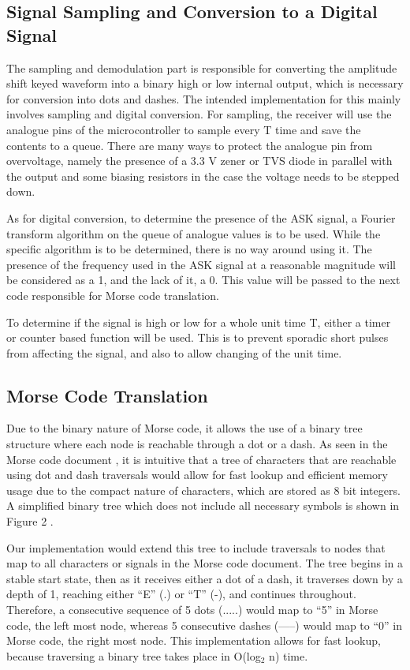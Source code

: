\documentclass{cce2014-design}
\begin{document}
\subsection{Signal Sampling and Conversion to a Digital Signal}
The sampling and demodulation part is responsible for converting the amplitude shift keyed waveform into a binary high or low internal output, which is necessary for conversion into dots and dashes. The intended implementation for this mainly involves sampling and digital conversion. For sampling, the receiver will use the analogue pins of the microcontroller to sample every T time and save the contents to a queue. There are many ways to protect the analogue pin from overvoltage, namely the presence of a 3.3 V zener or TVS diode in parallel with the output and some biasing resistors in the case the voltage needs to be stepped down.

As for digital conversion, to determine the presence of the ASK signal, a Fourier transform algorithm on the queue of analogue values is to be used. While the specific algorithm is to be determined, there is no way around using it. The presence of the frequency used in the ASK signal at a reasonable magnitude will be considered as a 1, and the lack of it, a 0. This value will be passed to the next code responsible for Morse code translation.

To determine if the signal is high or low for a whole unit time T, either a timer or counter based function will be used. This is to prevent sporadic short pulses from affecting the signal, and also to allow changing of the unit time.
\subsection{Morse Code Translation}

Due to the binary nature of Morse code, it allows the use of a binary tree structure where each node is reachable through a dot or a dash. As seen in the Morse code document \cite{itu2009}, it is intuitive that a tree of characters that are reachable using dot and dash traversals would allow for fast lookup and efficient memory usage due to the compact nature of characters, which are stored as 8 bit integers. A simplified binary tree which does not include all necessary symbols is shown in Figure 2 \cite{morsecode-tree}.

Our implementation would extend this tree to include traversals to nodes that map to all characters or signals in the Morse code document. The tree begins in a stable start state, then as it receives either a dot of a dash, it traverses down by a depth of 1, reaching either “E” (.) or “T” (-), and continues throughout. Therefore, a consecutive sequence of 5 dots (.....) would map to “5” in Morse code, the left most node, whereas 5 consecutive dashes (-----) would map to “0” in Morse code, the right most node. This implementation allows for fast lookup, because traversing a binary tree takes place in O(log$_2$ n) time. 
\end{document}

